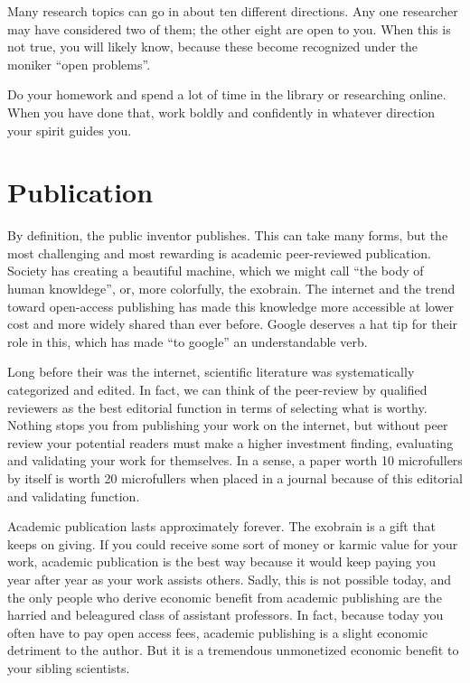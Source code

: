 \documentclass[
	fontsize=10pt, %
	twoside=false, %
	secnumdepth=1, %
]{kaobook}
\begin{document}
Many research topics can go in about ten different directions. Any one
researcher may have considered two of them; the other eight are open
to you. When this is not true, you will likely know, because these
become recognized under the moniker “open problems”.

Do your homework and spend a lot of time in the library or researching
online. When you have done that, work boldly and confidently in
whatever direction your spirit guides you.

\section{Publication}

By definition, the public inventor publishes.
This can take many forms, but the most challenging and most rewarding
is academic peer-reviewed publication.
Society has creating a beautiful machine, which we might
call ``the body of human knowldege'', or, more colorfully, the exobrain.
The internet and the trend toward open-access publishing has made this
knowledge more accessible at lower cost and more widely shared
than ever before.
Google deserves a hat tip for their role in this, which has made
``to google'' an understandable verb.

Long before their was the internet, scientific literature was systematically categorized
and edited. In fact, we can think of the peer-review by qualified
reviewers as the best editorial function in terms of selecting what
is worthy.
Nothing stops you from publishing your work on the internet, but
without peer review your potential readers must make a higher investment
finding, evaluating and validating your work for themselves.
In a sense, a paper worth 10 microfullers by itself is worth
20 microfullers when placed in a journal because of this
editorial and validating function.

Academic publication lasts approximately forever.
The exobrain is a gift that keeps on giving.
If you could receive some sort of money or karmic value
for your work, academic publication is the best way
because it would keep paying you year after year as
your work assists others. Sadly, this is not possible
today, and the only people who derive economic benefit
from academic publishing are the harried and beleagured class of assistant professors.
In fact, because today you often have to pay open access fees, academic
publishing is a slight economic detriment to the author.
But it is a tremendous unmonetized economic benefit to your
sibling scientists.
\end{document}
